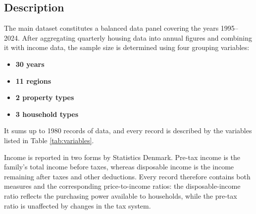 \subsection{Description}
The main dataset constitutes a balanced data panel covering the years 1995--2024. After aggregating quarterly housing data into annual figures and combining it with income data, the sample size is determined using four grouping variables:
\begin{itemize}
  \item \textbf{30 years}
  \item \textbf{11 regions}
  \item \textbf{2 property types}
  \item \textbf{3 household types}
\end{itemize}
It sums up to 1980 records of data, and every record is described by the variables listed in Table \ref{tab:variables}.

Income is reported in two forms by Statistics Denmark. Pre-tax income is the family's total income before taxes, whereas disposable income is the income remaining after taxes and other deductions. Every record therefore contains both measures and the corresponding price-to-income ratios: the disposable-income ratio reflects the purchasing power available to households, while the pre-tax ratio is unaffected by changes in the tax system.

